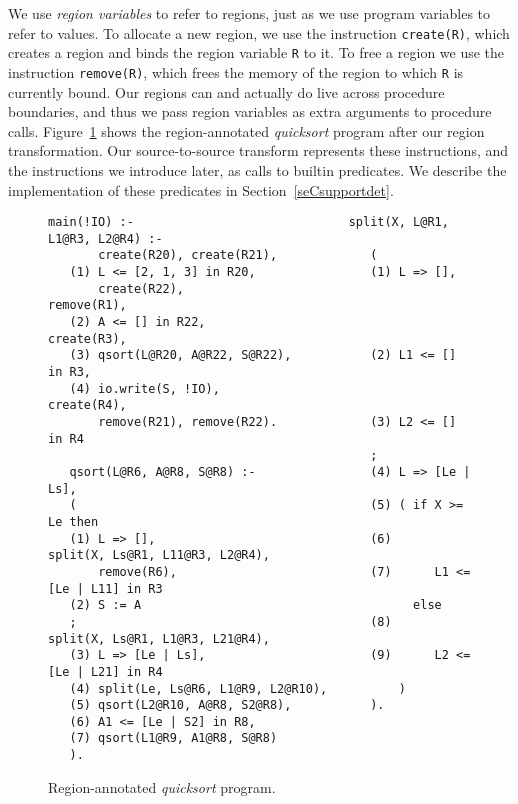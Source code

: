 \documentclass{tlp}
\newcommand{\code}[1]{{\tt#1}}
\begin{document}
We use \emph{region variables} to refer to regions,
just as we use program variables to refer to values.
To allocate a new region,
we use the instruction \code{create(R)},
which creates a region and binds the region variable \code{R} to it.
To free a region we use the instruction \code{remove(R)},
which frees the memory of the region to which \code{R} is currently bound.
Our regions can and actually do live across procedure boundaries,
and thus we pass region variables as extra arguments to procedure calls.
Figure~\ref{fig:running:annotated} shows
the region-annotated \emph{quicksort} program after our region transformation.
Our source-to-source transform represents these instructions,
and the instructions we introduce later,
as calls to builtin predicates.
We describe the implementation of these predicates
in Section~\ref{seCsupportdet}.

\begin{figure}[htb]
\scriptsize
\begin{Verbatim}[frame=single,framerule=0.2pt,framesep=3pt]
   main(!IO) :-                              split(X, L@R1, L1@R3, L2@R4) :-
       create(R20), create(R21),             (
   (1) L <= [2, 1, 3] in R20,                (1) L => [],
       create(R22),                              remove(R1),
   (2) A <= [] in R22,                           create(R3),
   (3) qsort(L@R20, A@R22, S@R22),           (2) L1 <= [] in R3,
   (4) io.write(S, !IO),                         create(R4),
       remove(R21), remove(R22).             (3) L2 <= [] in R4
                                             ;
   qsort(L@R6, A@R8, S@R8) :-                (4) L => [Le | Ls],
   (                                         (5) ( if X >= Le then
   (1) L => [],                              (6)      split(X, Ls@R1, L11@R3, L2@R4),
       remove(R6),                           (7)      L1 <= [Le | L11] in R3
   (2) S := A                                      else
   ;                                         (8)      split(X, Ls@R1, L1@R3, L21@R4),
   (3) L => [Le | Ls],                       (9)      L2 <= [Le | L21] in R4
   (4) split(Le, Ls@R6, L1@R9, L2@R10),          )
   (5) qsort(L2@R10, A@R8, S2@R8),           ).
   (6) A1 <= [Le | S2] in R8,
   (7) qsort(L1@R9, A1@R8, S@R8)
   ).
\end{Verbatim}
\small
\caption{Region-annotated \emph{quicksort} program.}
\normalsize
\label{fig:running:annotated}
\end{figure}
\end{document}
